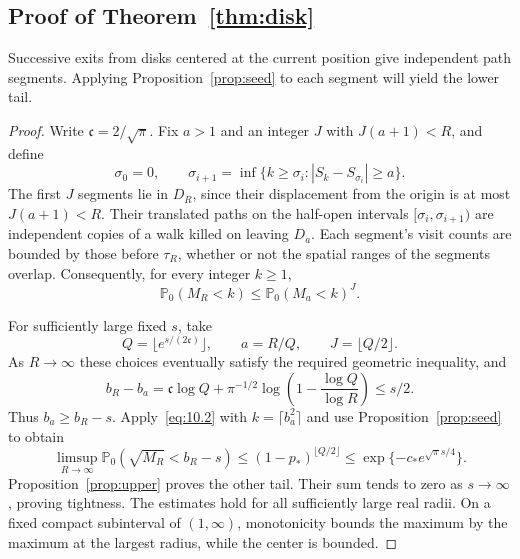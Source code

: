 \documentclass[11pt,letterpaper,reqno]{amsart}
\numberwithin{equation}{section}
\theoremstyle{remark}
\begin{document}
\subsection{Proof of Theorem~\ref{thm:disk}}
Successive exits from disks centered at the current position give independent path segments. Applying Proposition~\ref{prop:seed} to each segment will yield the lower tail.
\begin{proof}
Write $\mathfrak c=2/\sqrt\pi$. Fix $a>1$ and an integer $J$ with $J(a+1)<R$, and define
\begin{equation}\label{eq:10.1}
\sigma_0=0,\qquad
\sigma_{i+1}=\inf\{k\ge\sigma_i:|S_k-S_{\sigma_i}|\ge a\}.
\end{equation}
The first $J$ segments lie in $D_R$, since their displacement from the origin is at most $J(a+1)<R$. Their translated paths on the half-open intervals $[\sigma_i,\sigma_{i+1})$ are independent copies of a walk killed on leaving $D_a$. Each segment's visit counts are bounded by those before $\tau_R$, whether or not the spatial ranges of the segments overlap. Consequently, for every integer $k\ge1$,
\begin{equation}\label{eq:10.2}
\mathbb P_0(M_R<k)\le\mathbb P_0(M_a<k)^J.
\end{equation}

For sufficiently large fixed $s$, take
\begin{equation}\label{eq:10.3}
Q=\lfloor e^{s/(2\mathfrak c)}\rfloor,\qquad
a=R/Q,\qquad J=\lfloor Q/2\rfloor.
\end{equation}
As $R\to\infty$ these choices eventually satisfy the required geometric inequality, and
\begin{equation}\label{eq:10.4}
b_R-b_a=\mathfrak c\log Q+
\pi^{-1/2}\log\left(1-\frac{\log Q}{\log R}\right)\le s/2.
\end{equation}
Thus $b_a\ge b_R-s$. Apply~\eqref{eq:10.2} with $k=\lceil b_a^2\rceil$ and use Proposition~\ref{prop:seed} to obtain
\begin{equation}\label{eq:10.5}
\limsup_{R\to\infty}\mathbb P_0(\sqrt{M_R}<b_R-s)
\le(1-p_*)^{\lfloor Q/2\rfloor}
\le\exp\{-c_*e^{\sqrt\pi s/4}\}.
\end{equation}
Proposition~\ref{prop:upper} proves the other tail. Their sum tends to zero as $s\to\infty$, proving tightness. The estimates hold for all sufficiently large real radii. On a fixed compact subinterval of $(1,\infty)$, monotonicity bounds the maximum by the maximum at the largest radius, while the center is bounded.
\end{proof}
\end{document}
